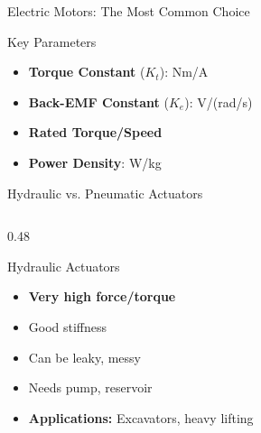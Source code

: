 \documentclass[10pt]{beamer}
\begin{document}
\begin{frame}{Electric Motors: The Most Common Choice}
	\begin{block}{Key Parameters}
		\begin{itemize}
			\item \textbf{Torque Constant} ($K_t$): Nm/A
			\item \textbf{Back-EMF Constant} ($K_e$): V/(rad/s)
			\item \textbf{Rated Torque/Speed}
			\item \textbf{Power Density}: W/kg
		\end{itemize}
	\end{block}
\end{frame}

\begin{frame}{Hydraulic vs. Pneumatic Actuators}
	\begin{columns}
		\begin{column}{0.48\textwidth}
			\begin{block}{Hydraulic Actuators}
				\begin{center}
				\end{center}
				\begin{itemize}
					\item \textbf{Very high force/torque}
					\item Good stiffness
					\item Can be leaky, messy
					\item Needs pump, reservoir
					\item \textbf{Applications:} Excavators, heavy lifting
				\end{itemize}
			\end{block}
		\end{column}
		

\end{columns}
\end{frame}
\end{document}
